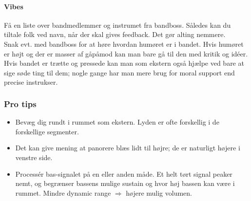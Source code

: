 \paragraph{Vibes}
Få en liste over bandmedlemmer og instrumet fra bandboss. Således kan du tiltale folk ved navn, når der skal gives feedback. Det gør alting nemmere.\\
Snak evt. med bandboss for at høre hvordan humøret er i bandet. Hvis humøret er højt og der er masser af gåpåmod kan man bare gå til den med kritik og idéer.
Hvis bandet er trætte og pressede kan man som ekstern også hjælpe ved bare at sige søde ting til dem; nogle gange har man mere brug for moral support end precise instrukser.\\

\subsubsection{Pro tips}
\begin{itemize}
    \item Bevæg dig rundt i rummet som ekstern. Lyden er ofte forskellig i de forskellige segmenter.
    \item Det kan give mening at panorere blæs lidt til højre; de er naturligt højere i venstre side.
    \item Processér bas-signalet på en eller anden måde. Et helt tørt signal peaker nemt, og begrænser bassens mulige sustain og hvor høj bassen kan være i rummet. Mindre dynamic range $\Rightarrow$ højere mulig volumen.
\end{itemize}